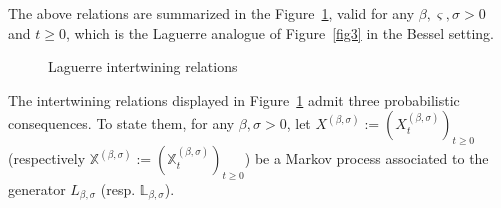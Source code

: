 \documentclass[AHL,Unicode,longabstracts]{cedram}
\newcommand{\df}{\mathrel{:=}}
\newcommand{\fn}{\mathfrak{n}}
\newcommand{\fX}{\mathbb{X}}
\newcommand{\wit}{\widehat}
\newcommand{\dLg}{{\discret{L}}}
\newcommand{\Lg}{L}
\newcommand{\dLs}{{\discret{K}}}
\newcommand{\Ls}{K}
\newcommand{\esL}{\mathbf{L}}
\newcommand{\esLd}{\ell}
\newcommand{\discret}[1]{\mathds{#1}}
\begin{document}
The above relations are summarized in the Figure~\ref{fig4}, valid for any $\beta,\varsigma,\sigma>0$ and $t\geq 0$, which is the Laguerre analogue of Figure~\ref{fig3} in the Bessel setting.
\begin{figure}[ht]\centering
{}
\caption{Laguerre intertwining relations}\label{fig4}
\end{figure}


The intertwining relations displayed in Figure~\ref{fig4} admit three probabilistic consequences. To state them, for any $\beta,\sigma>0$, let $X^{(\beta,\sigma)}\df(X_t^{(\beta,\sigma)})_{t\geq 0}$ (respectively $\fX^{(\beta,\sigma)}\df(\fX_t^{(\beta,\sigma)})_{t\geq 0}$) be a Markov process associated to the generator $\Lg_{\beta,\sigma}$ (resp. $\dLg_{\beta,\sigma}$).
\end{document}
